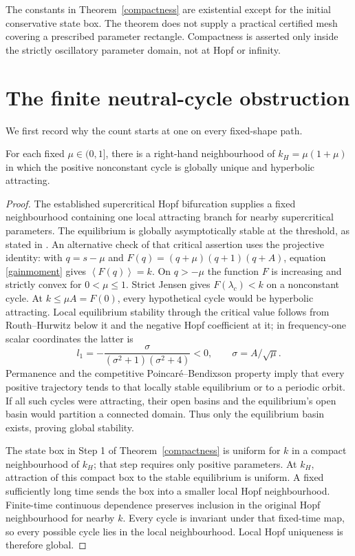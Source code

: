 \documentclass[11pt,a4paper]{article}
\theoremstyle{remark}\newtheorem{remark}[theorem]{Remark}
\newcommand{\av}[1]{\left\langle #1\right\rangle}
\begin{document}
The constants in Theorem~\ref{compactness} are existential except for the initial conservative state box. The theorem does not supply a practical certified mesh covering a prescribed parameter rectangle. Compactness is asserted only inside the strictly oscillatory parameter domain, not at Hopf or infinity.

\section{The finite neutral-cycle obstruction}
We first record why the count starts at one on every fixed-shape path.

\begin{lemma}\label{hopfcollar}
For each fixed $\mu\in(0,1]$, there is a right-hand neighbourhood of $k_H=\mu(1+\mu)$ in which the positive nonconstant cycle is globally unique and hyperbolic attracting.
\end{lemma}
\begin{proof}
The established supercritical Hopf bifurcation supplies a fixed neighbourhood containing one local attracting branch for nearby supercritical parameters. The equilibrium is globally asymptotically stable at the threshold, as stated in \cite[Theorem 13(v)]{BH}. An alternative check of that critical assertion uses the projective identity: with $q=s-\mu$ and $F(q)=(q+\mu)(q+1)(q+A)$, equation \eqref{gainmoment} gives $\av{F(q)}=k$. On $q>-\mu$ the function $F$ is increasing and strictly convex for $0<\mu\le1$. Strict Jensen gives $F(\lambda_c)<k$ on a nonconstant cycle. At $k\le\mu A=F(0)$, every hypothetical cycle would be hyperbolic attracting. Local equilibrium stability through the critical value follows from Routh--Hurwitz below it and the negative Hopf coefficient at it; in frequency-one scalar coordinates the latter is
\[
 l_1=-\frac{\sigma}{(\sigma^2+1)(\sigma^2+4)}<0,\qquad \sigma=A/\sqrt\mu.
\]
Permanence and the competitive Poincar\'e--Bendixson property imply that every positive trajectory tends to that locally stable equilibrium or to a periodic orbit. If all such cycles were attracting, their open basins and the equilibrium's open basin would partition a connected domain. Thus only the equilibrium basin exists, proving global stability.

The state box in Step 1 of Theorem~\ref{compactness} is uniform for $k$ in a compact neighbourhood of $k_H$; that step requires only positive parameters. At $k_H$, attraction of this compact box to the stable equilibrium is uniform. A fixed sufficiently long time sends the box into a smaller local Hopf neighbourhood. Finite-time continuous dependence preserves inclusion in the original Hopf neighbourhood for nearby $k$. Every cycle is invariant under that fixed-time map, so every possible cycle lies in the local neighbourhood. Local Hopf uniqueness is therefore global.
\end{proof}
\end{document}
